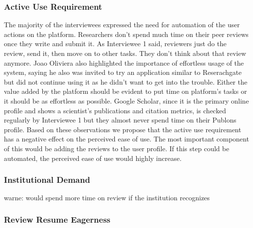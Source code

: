 \subsubsection{Active Use Requirement}

The majority of the interviewees expressed the need for automation of the user actions on the platform. Researchers don't spend much time on their peer reviews once they write and submit it. As Interviewee 1 said, reviewers just do the review, send it, then move on to other tasks. They don't think about that review anymore. Joao Oliviera also highlighted the importance of effortless usage of the system, saying he also was invited to try an application similar to Reserachgate but did not continue using it as he didn't want to get into the trouble. Either the value added by the platform should be evident to put time on platform's tasks or it should be as effortless as possible. Google Scholar, since it is the primary online profile and shows a scientist's publications and citation metrics, is checked regularly by Interviewee 1 but they almost never spend time on their Publons profile. Based on these observations we propose that the active use requirement has a negative effect on the perceived ease of use. The most important component of this would be adding the reviews to the user profile. If this step could be automated, the perceived ease of use would highly increase.


\subsubsection{Institutional Demand}

warne: would spend more time on review if the institution recognizes

\subsubsection{Review Resume Eagerness}












